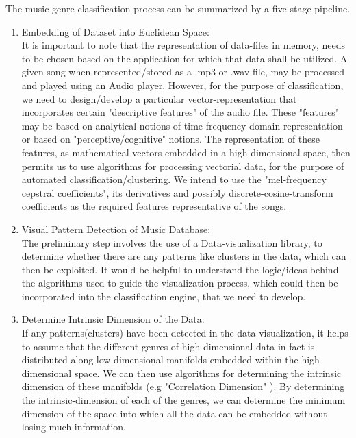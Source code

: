 \documentclass[12pt]{article}
\begin{document}
The music-genre classification process can be summarized by a five-stage pipeline. 
\begin{enumerate}
\item Embedding of Dataset into Euclidean Space:\\
It is important to note that the representation of data-files in memory, needs to be chosen based on the application for which that data shall be utilized. A given song when represented/stored as a .mp3 or .wav file, may be processed and played using an Audio player. However, for the purpose of classification, we need to design/develop a particular vector-representation that incorporates certain "descriptive features" of the audio file. These "features" may be based on analytical notions of time-frequency domain representation or based on "perceptive/cognitive" notions. The representation of these features, as mathematical vectors embedded in a high-dimensional space, then permits us to use algorithms for processing vectorial data, for the purpose of automated classification/clustering. We intend to use the "mel-frequency cepstral coefficients", its derivatives and possibly discrete-cosine-transform coefficients as the required features representative of the songs. 

\item Visual Pattern Detection of Music Database: \\
The preliminary step involves the use of a Data-visualization library, to determine whether there are any patterns like clusters in the data, which can then be exploited. It would be helpful to understand the logic/ideas behind the algorithms used to guide the visualization process, which could then be incorporated into the classification engine, that we need to develop. 

\item Determine Intrinsic Dimension of the Data:\\
If any patterns(clusters) have been detected in the data-visualization, it helps to assume that the different genres of high-dimensional data in fact is distributed along low-dimensional manifolds embedded within the high-dimensional space. We can then use algorithms for determining the intrinsic dimension of these manifolds (e.g "Correlation Dimension" ). By determining the intrinsic-dimension of each of the genres, we can determine the minimum dimension of the space into which all the data can be embedded without losing much information. 


\end{enumerate}
\end{document}
